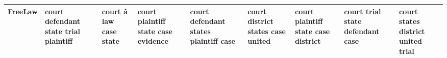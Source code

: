 \documentclass[11pt,a4paper]{article}
\begin{document}
\begin{appendices}
\begin{table*}[htb]
\begin{tiny}
\begin{tabular}{|p{}|p{}|p{}|p{}|p{}|p{}|p{}|p{}|p{}|}
    FreeLaw & court \newline defendant \newline state \newline trial \newline plaintiff & court \newline â \newline law \newline case \newline state & court \newline plaintiff \newline state \newline case \newline evidence & court \newline defendant \newline states \newline plaintiff \newline case & court \newline district \newline states \newline case \newline united & court \newline plaintiff \newline state \newline case \newline district & court \newline trial \newline state \newline defendant \newline case & court \newline states \newline district \newline united \newline trial\\\hline

\end{tabular}
\end{tiny}
\end{table*}
\end{appendices}
\end{document}
